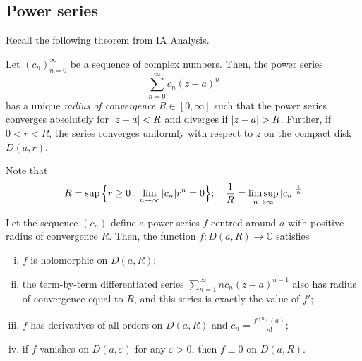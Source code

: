 \subsection{Power series}
Recall the following theorem from IA Analysis.
\begin{theorem}
	Let \( (c_n)_{n=0}^\infty \) be a sequence of complex numbers.
	Then, the power series
	\[ \sum_{n=0}^\infty c_n (z-a)^n \]
	has a unique \textit{radius of convergence} \( R \in [0,\infty] \) such that the power series converges absolutely for \( \abs{z - a} < R \) and diverges if \( \abs{z - a} > R \).
	Further, if \( 0 < r < R \), the series converges uniformly with respect to \( z \) on the compact disk \( D(a,r) \).
\end{theorem}
Note that
\[ R = \sup\qty{r \geq 0 \colon \lim_{n \to \infty} \abs{c_n}r^n = 0};\quad \frac{1}{R} = \limsup_{n \to \infty} \abs{c_n}^{\frac{1}{n}} \]
\begin{theorem}
	Let the sequence \( (c_n) \) define a power series \( f \) centred around \( a \) with positive radius of convergence \( R \).
	Then, the function \( f \colon D(a,R) \to \mathbb C \) satisfies
	\begin{enumerate}[(i)]
		\item \( f \) is holomorphic on \( D(a,R) \);
		\item the term-by-term differentiated series \( \sum_{n=1}^\infty nc_n(z-a)^{n-1} \) also has radius of convergence equal to \( R \), and this series is exactly the value of \( f' \);
		\item \( f \) has derivatives of all orders on \( D(a,R) \) and \( c_n = \frac{f^{(n)}(a)}{n!} \);
		\item if \( f \) vanishes on \( D(a, \varepsilon) \) for any \( \varepsilon > 0 \), then \( f \equiv 0 \) on \( D(a,R) \).
	\end{enumerate}
\end{theorem}
